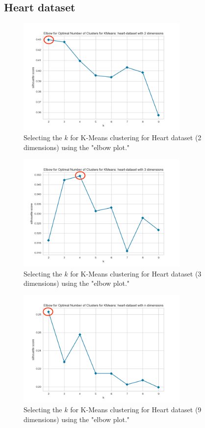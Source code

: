 \subsection{Heart dataset}
\begin{figure}[H]
  \includegraphics[width=0.75\textwidth]{Method/images/k-values/heart-dataset-2-kmeans.png}
  \caption{Selecting the $k$ for K-Means clustering for Heart dataset (2 dimensions) using the "elbow plot."}
  \label{hyperparameters:agglomerative-heart-dataset-2d}
\end{figure}
\begin{figure}[H]
  \includegraphics[width=0.75\textwidth]{Method/images/k-values/heart-dataset-3-kmeans.png}
  \caption{Selecting the $k$ for K-Means clustering for Heart dataset (3 dimensions) using the "elbow plot."}
  \label{hyperparameters:agglomerative-heart-dataset-3d}
\end{figure}
\begin{figure}[H]
  \includegraphics[width=0.75\textwidth]{Method/images/k-values/heart-dataset-n-kmeans.png}
  \caption{Selecting the $k$ for K-Means clustering for Heart dataset (9 dimensions) using the "elbow plot."}
  \label{hyperparameters:agglomerative-heart-dataset-9d}
\end{figure}
\newpage

